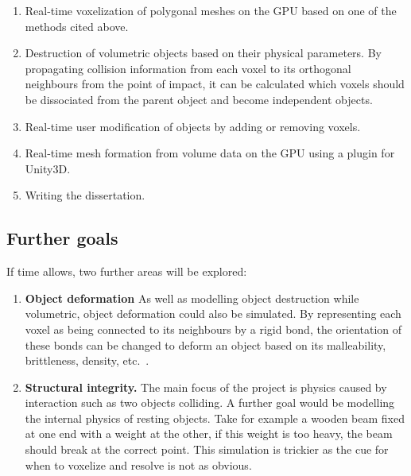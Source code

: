 \begin{enumerate}

\item Real-time voxelization of polygonal meshes on the GPU based on one of the methods cited above.

\item Destruction of volumetric objects based on their physical parameters. By propagating collision information from each voxel to its orthogonal neighbours from the point of impact, it can be calculated which voxels should be dissociated from the parent object and become independent objects.

\item Real-time user modification of objects by adding or removing voxels.

\item Real-time mesh formation from volume data on the GPU using a plugin for Unity3D\cite{MCGPU}.

\item Writing the dissertation.

\end{enumerate}

\clearpage
\subsection{Further goals}

\label{stretch}

If time allows, two further areas will be explored:

\begin{enumerate}

\item \textbf{Object deformation} As well as modelling object destruction while volumetric, object deformation could also be simulated. By representing each voxel as being connected to its neighbours by a rigid bond, the orientation of these bonds can be changed to deform an object based on its malleability, brittleness, density, etc.~.

\item \textbf{Structural integrity.} The main focus of the project is physics caused by interaction such as two objects colliding. A further goal would be modelling the internal physics of resting objects. Take for example a wooden beam fixed at one end with a weight at the other, if this weight is too heavy, the beam should break at the correct point. This simulation is trickier as the cue for when to voxelize and resolve is not as obvious.

\end{enumerate}